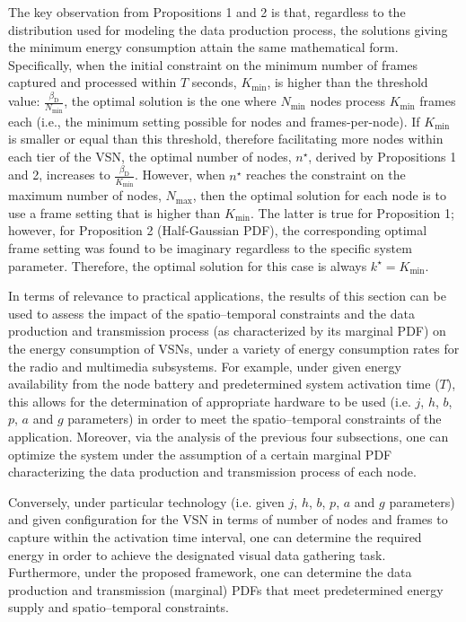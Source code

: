 \documentclass[twocolumn,english]{IEEEtran}
\theoremstyle{plain}
\theoremstyle{definition}
\begin{document}
The key observation from Propositions 1 and 2 is that, regardless
to the distribution used for modeling the data production process,
the solutions giving the minimum energy consumption attain the same
mathematical form. Specifically, when the initial constraint on the
minimum number of frames captured and processed within $T$ seconds,
$K_{\min}$, is higher than the threshold value: $\frac{\beta_{\text{D}}}{N_{\min}}$,
the optimal solution is the one where $N_{\min}$ nodes process $K_{\min}$
frames each (i.e., the minimum setting possible for nodes and frames-per-node).
If $K_{\min}$ is smaller or equal than this threshold, therefore
facilitating more nodes within each tier of the VSN, the optimal number
of nodes, $n^{\star}$, derived by Propositions 1 and 2, increases
to $\frac{\beta_{\text{D}}}{K_{\min}}$. However, when $n^{\star}$
reaches the constraint on the maximum number of nodes, $N_{\max}$,
then the optimal solution for each node is to use a frame setting
that is higher than $K_{\min}$. The latter is true for Proposition
1; however, for Proposition 2 (Half-Gaussian PDF), the corresponding
optimal frame setting was found to be imaginary regardless to the
specific system parameter. Therefore, the optimal solution for this
case is always $k^{\star}=K_{\min}$.

In terms of relevance to practical applications, the results of this
section can be used to assess the impact of the spatio--temporal constraints
and the data production and transmission process (as characterized
by its marginal PDF) on the energy consumption of VSNs, under a variety
of energy consumption rates for the radio and multimedia subsystems.
For example, under given energy availability from the node battery
and predetermined system activation time ($T$), this allows for the
determination of appropriate hardware to be used (i.e. $j$, $h$,
$b$, $p$, $a$ and $g$ parameters) in order to meet the spatio--temporal
constraints of the application. Moreover, via the analysis of the
previous four subsections, one can optimize the system under the assumption
of a certain marginal PDF characterizing the data production and transmission
process of each node.

Conversely, under particular technology (i.e. given $j$, $h$, $b$,
$p$, $a$ and $g$ parameters) and given configuration for the VSN
in terms of number of nodes and frames to capture within the activation
time interval, one can determine the required energy in order to achieve
the designated visual data gathering task. Furthermore, under the
proposed framework, one can determine the data production and transmission
(marginal) PDFs that meet predetermined energy supply and spatio--temporal
constraints. 
\end{document}
